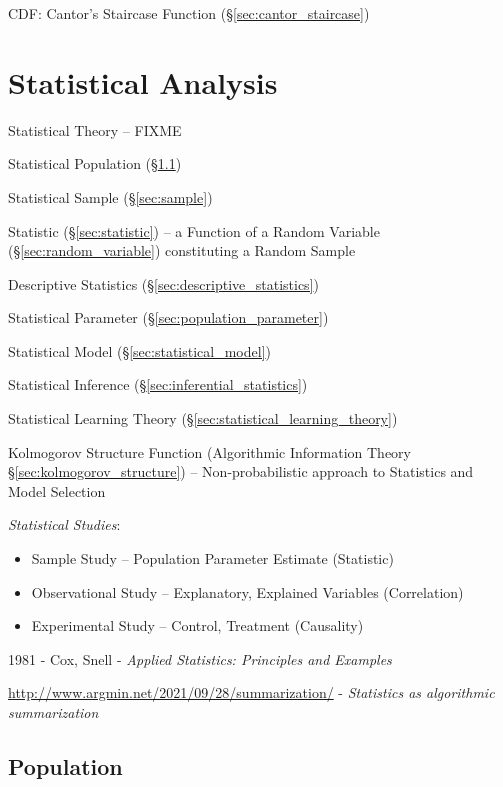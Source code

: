 CDF: Cantor's Staircase Function (\S\ref{sec:cantor_staircase})



\section{Statistical Analysis}\label{sec:statistical_analysis}

Statistical Theory -- FIXME

Statistical Population (\S\ref{sec:population})

Statistical Sample (\S\ref{sec:sample})

Statistic (\S\ref{sec:statistic}) -- a Function of a Random Variable
(\S\ref{sec:random_variable}) constituting a Random Sample

Descriptive Statistics (\S\ref{sec:descriptive_statistics})

Statistical Parameter (\S\ref{sec:population_parameter})

Statistical Model (\S\ref{sec:statistical_model})

Statistical Inference (\S\ref{sec:inferential_statistics})

Statistical Learning Theory (\S\ref{sec:statistical_learning_theory})

Kolmogorov Structure Function (Algorithmic Information Theory
\S\ref{sec:kolmogorov_structure}) -- Non-probabilistic approach to Statistics
and Model Selection

\emph{Statistical Studies}:
\begin{itemize}
  \item Sample Study -- Population Parameter Estimate (Statistic)
  \item Observational Study -- Explanatory, Explained Variables (Correlation)
  \item Experimental Study -- Control, Treatment (Causality)
\end{itemize}

1981 - Cox, Snell - \emph{Applied Statistics: Principles and Examples}

\url{http://www.argmin.net/2021/09/28/summarization/} -
\emph{Statistics as algorithmic summarization}



\subsection{Population}\label{sec:population}

